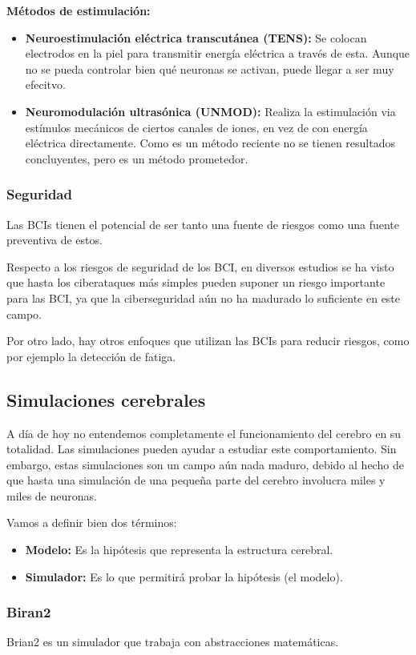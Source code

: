 \documentclass[12pt, letterpaper]{article}
\begin{document}
\textbf{Métodos de estimulación:}
\begin{itemize}
    \item \textbf{Neuroestimulación eléctrica transcutánea (TENS):} Se colocan electrodos en la piel para transmitir energía eléctrica a través de esta. Aunque no se pueda controlar bien qué neuronas se activan, puede llegar a ser muy efecitvo.
    \item \textbf{Neuromodulación ultrasónica (UNMOD):} Realiza la estimulación via estímulos mecánicos de ciertos canales de iones, en vez de con energía eléctrica directamente. Como es un método reciente no se tienen resultados concluyentes, pero es un método prometedor.
\end{itemize}

\subsubsection{Seguridad}
Las BCIs tienen el potencial de ser tanto una fuente de riesgos como una fuente preventiva de estos.

Respecto a los riesgos de seguridad de los BCI, en diversos estudios se ha visto que hasta los ciberataques más simples pueden suponer un riesgo importante para las BCI, ya que la ciberseguridad aún no ha madurado lo suficiente en este campo.

Por otro lado, hay otros enfoques que utilizan las BCIs para reducir riesgos, como por ejemplo la detección de fatiga.

\subsection{Simulaciones cerebrales}
A día de hoy no entendemos completamente el funcionamiento del cerebro en su totalidad. Las simulaciones pueden ayudar a estudiar este comportamiento. Sin embargo, estas simulaciones son un campo aún nada maduro, debido al hecho de que hasta una simulación de una pequeña parte del cerebro involucra miles y miles de neuronas.

Vamos a definir bien dos términos:
\begin{itemize}
    \item \textbf{Modelo:} Es la hipótesis que representa la estructura cerebral.
    \item \textbf{Simulador:} Es lo que permitirá probar la hipótesis (el modelo).
\end{itemize}


\subsubsection{Biran2}
Brian2 es un simulador que trabaja con abstracciones matemáticas. 
\end{document}
